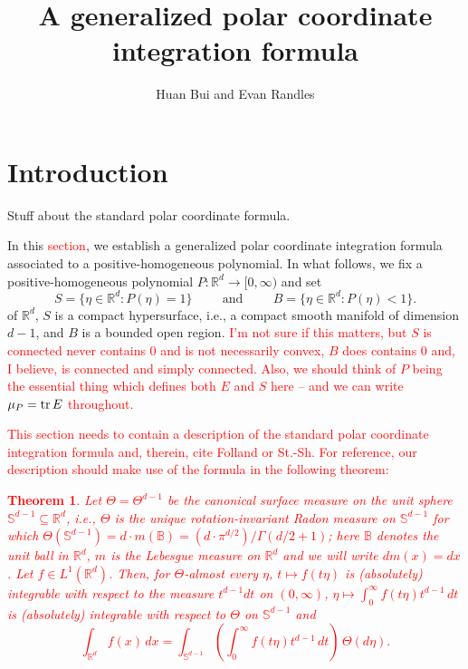 \documentclass[11pt]{article}
\author{Huan Bui and Evan Randles}
\title{A generalized polar coordinate integration formula}
\date{}
\newtheorem{theorem}{Theorem}[section]
\begin{document}
\maketitle


\section{Introduction}

Stuff about the standard polar coordinate formula.

In this \textcolor{red}{section}, we establish a generalized polar coordinate integration formula associated to a positive-homogeneous polynomial. In what follows, we fix a positive-homogeneous polynomial $P:\mathbb{R}^d\to [0,\infty)$ and set
\begin{equation*}
S=\{\eta\in\mathbb{R}^d:P(\eta)=1\}\hspace{1cm}\mbox{and}\hspace{1cm}B=\{\eta\in\mathbb{R}^d:P(\eta)<1\}. 
\end{equation*}
 of $\mathbb{R}^d$, $S$ is a compact hypersurface, i.e., a compact smooth manifold of dimension $d-1$, and $B$ is a bounded open region. \textcolor{red}{I'm not sure if this matters, but $S$ is connected never contains $0$ and is not necessarily convex, $B$ does contains $0$ and, I believe, is connected and simply connected. Also, we should think of $P$ being the essential thing which defines both $E$ and $S$ here -- and we can write $\mu_P=\tr E$ throughout. }

\textcolor{red}{This section needs to contain a description of the standard polar coordinate integration formula and, therein, cite Folland or St.-Sh. For reference, our description should make use of the formula in the following theorem:
\begin{theorem}
Let $\Theta=\Theta^{d-1}$ be the canonical surface measure on the unit sphere $\mathbb{S}^{d-1}\subseteq \mathbb{R}^d$, i.e., $\Theta$ is the unique rotation-invariant Radon measure on $\mathbb{S}^{d-1}$ for which $\Theta(\mathbb{S}^{d-1})=d\cdot m(\mathbb{B})=(d\cdot\pi^{d/2})/\Gamma(d/2+1)$;  here $\mathbb{B}$ denotes the unit ball in $\mathbb{R}^d$, $m$ is the Lebesgue measure on $\mathbb{R}^d$ and we will write $dm(x)=dx$. Let $f\in L^1(\mathbb{R}^d)$. Then, for $\Theta$-almost every $\eta$, $t\mapsto f(t\eta)$ is (absolutely) integrable with respect to the measure $t^{d-1}dt$ on $(0,\infty)$, $\eta\mapsto \int_0^\infty f(t\eta)t^{d-1}\,dt$ is (absolutely) integrable with respect to $\Theta$ on $\mathbb{S}^{d-1}$ and
\begin{equation}\label{eq:StandardPolarIntegrationFormula}
\int_{\mathbb{R}^d}f(x)\,dx=\int_{\mathbb{S}^{d-1}}\left(\int_0^\infty f(t\eta)t^{d-1}\,dt\right)\,\Theta(d\eta).
\end{equation}
\end{theorem}}
\end{document}
